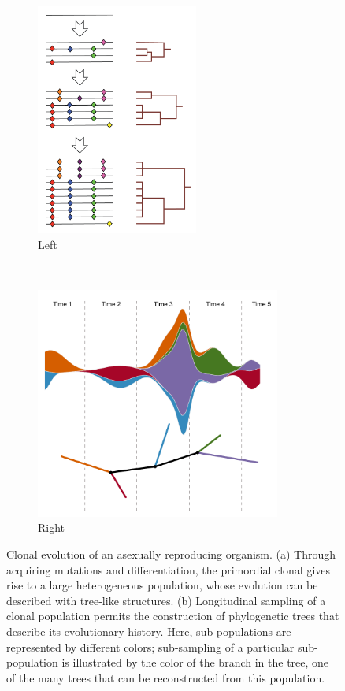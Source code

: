 \documentclass[a4paper,11pt]{article}
\begin{document}
\begin{figure}
    \begin{subfigure}{0.5\linewidth}
    \centering
    \includegraphics[height=3in]{figures/ClonalEvolutionTrees.png}
    \caption{Left}
    \end{subfigure}
    ~
    \begin{subfigure}{0.5\linewidth}
    \centering
    \includegraphics[height=3in]{figures/cartoon_1.pdf}
    \caption{Right}
    \end{subfigure}
    \caption{Clonal evolution of an asexually reproducing organism. (a) Through acquiring mutations and differentiation, the primordial clonal gives rise to a large heterogeneous population, whose evolution can be described with tree-like structures. (b) Longitudinal sampling of a clonal population permits the construction of phylogenetic trees that describe its evolutionary history. Here, sub-populations are represented by different colors; sub-sampling of a particular sub-population is illustrated by the color of the branch in the tree, one of the many trees that can be reconstructed from this population. }
     \label{fig:cartoon_1}
\end{figure}
\end{document}
